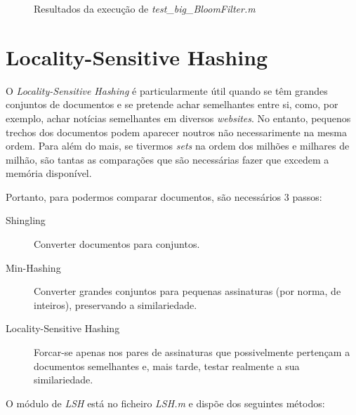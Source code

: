 \documentclass[a4paper,11pt,openright,oneside]{report}
\begin{document}
\begin{figure}[ht]	
\center
{}
\caption{Resultados da execução de \textit{test\_big\_BloomFilter.m}}
\label{fig:testbigbloom}
\end{figure}


\chapter{Locality-Sensitive Hashing}
\label{chap.lsh}

O \textit{Locality-Sensitive Hashing} é particularmente útil quando se têm grandes conjuntos de documentos e se pretende achar semelhantes entre si, como, por exemplo, achar notícias semelhantes em diversos \textit{websites}. No entanto, pequenos trechos dos documentos podem aparecer noutros não necessarimente na mesma ordem. Para além do mais, se tivermos \textit{sets} na ordem dos milhões e milhares de milhão, são tantas as comparações que são necessárias fazer que excedem a memória disponível.

Portanto, para podermos comparar documentos, são necessários 3 passos:

\begin{description}
\item[Shingling]
Converter documentos para conjuntos.
\item[Min-Hashing]
Converter grandes conjuntos para pequenas assinaturas (por norma, de inteiros), preservando a similariedade.
\item[Locality-Sensitive Hashing]
Forcar-se apenas nos pares de assinaturas que possivelmente pertençam a documentos semelhantes e, mais tarde, testar realmente a sua similariedade.
\end{description}

O módulo de \textit{LSH} está no ficheiro \textit{LSH.m} e dispõe dos seguintes métodos:
\end{document}
